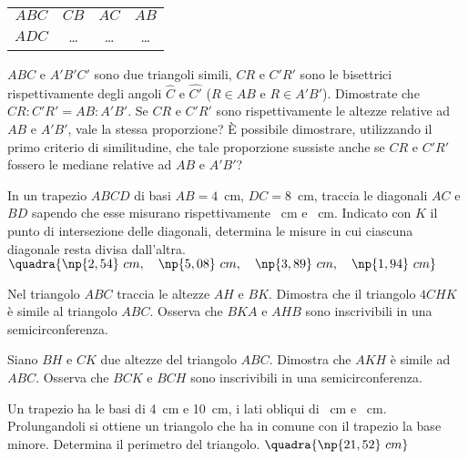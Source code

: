 \begin{multicols}{2}
\begin{esercizio}
\begin{center}
\begin{tabular}{cccc}
\toprule
\(ABC\) & \(CB\) & \(AC\) & \(AB\)\\
\(ADC\) & \ldots{} & \ldots{} & \ldots{}\\
\bottomrule
\end{tabular}
\end{center}
\end{esercizio}

\begin{esercizio}
\label{ese:6.63}
\(ABC\) e \(A'B'C'\) sono due triangoli simili, \(CR\) e \(C'R'\) sono le 
bisettrici rispettivamente degli angoli \(\widehat{C}\) e 
\(\widehat{C'}\) (\(R\in AB\) e \(R\in A'B'\)). Dimostrate che \(CR : C'R' = 
AB : A'B'\). Se \(CR\) e \(C'R'\) sono rispettivamente le altezze relative 
ad \(AB\) e \(A'B'\), vale la stessa proporzione? È possibile 
dimostrare, utilizzando il primo criterio di similitudine, che tale 
proporzione sussiste anche se \(CR\) e \(C'R'\) fossero le mediane 
relative ad \(AB\) e \(A'B'\)?
\end{esercizio}

\begin{esercizio}
\label{ese:6.64}
In un trapezio \(ABCD\) di basi \(AB=4\)~cm, \(DC=8\)~cm, traccia le 
diagonali \(AC\) e \(BD\) sapendo che esse misurano rispettivamente 
~cm e ~cm. Indicato con \(K\) il punto di 
intersezione delle diagonali, determina le misure in cui ciascuna 
diagonale resta divisa dall'altra. 
\hfill\(\quadra{\np{2,54}~cm,\quad \np{5,08}~cm,\quad \np{3,89}~cm,\quad 
\np{1,94}~cm}\)
\end{esercizio}

\begin{esercizio}
\label{ese:6.65}
Nel triangolo \(ABC\) traccia le altezze \(AH\) e \(BK\). Dimostra che il 
triangolo \(4CHK\) è simile al triangolo \(ABC\). Osserva che \(BKA\) e 
\(AHB\) sono inscrivibili in una semicirconferenza.
\end{esercizio}

\begin{esercizio}
\label{ese:6.66}
Siano \(BH\) e \(CK\) due altezze del triangolo \(ABC\). Dimostra che \(AKH\) 
è simile ad \(ABC\). Osserva che \(BCK\) e \(BCH\) sono inscrivibili in una 
semicirconferenza.
\end{esercizio}

\begin{esercizio}
\label{ese:6.67}
Un trapezio ha le basi di 4~cm e 10~cm, i lati obliqui di 
~cm e ~cm. Prolungandoli si ottiene un triangolo che 
ha in comune con il trapezio la base minore. Determina il perimetro 
del triangolo. 
\hfill\(\quadra{\np{21,52}~cm}\)
\end{esercizio}


\end{multicols}
